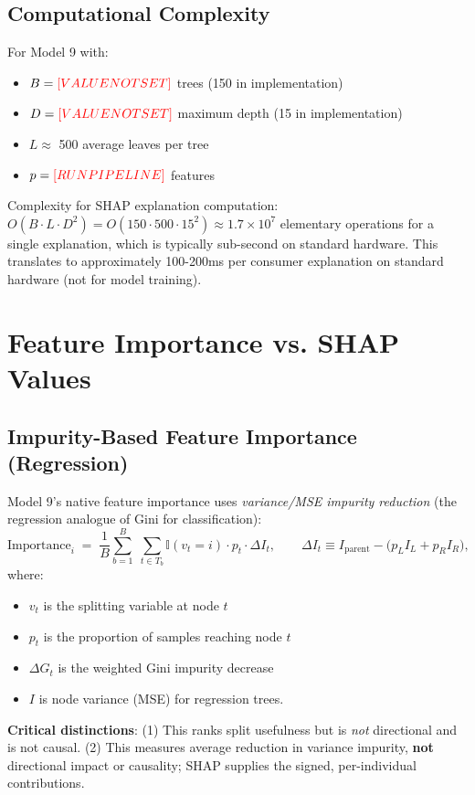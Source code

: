 \subsection{Computational Complexity}
For Model 9 with:
\begin{itemize}
    \item $B = \textcolor{red}{[VALUE NOT SET]}{}$ trees (150 in implementation)
    \item $D = \textcolor{red}{[VALUE NOT SET]}{}$ maximum depth (15 in implementation)
    \item $L \approx$ 500 average leaves per tree
    \item $p = \textcolor{red}{[RUN PIPELINE]}{}$ features
\end{itemize}
%
Complexity for SHAP explanation computation: $O(B \cdot L \cdot D^2) = O(150 \cdot 500 \cdot 15^2) \approx 1.7 \times 10^7$ elementary operations for a single explanation, which is typically sub-second on standard hardware. This translates to approximately 100-200ms per consumer explanation on standard hardware (not for model training).

\section{Feature Importance vs. SHAP Values}
\subsection{Impurity-Based Feature Importance (Regression)}
Model 9's native feature importance uses \emph{variance/MSE impurity reduction} (the regression analogue of Gini for classification):
%
\begin{equation}
    \text{Importance}_i \;=\; \frac{1}{B} \sum_{b=1}^{B} \;\sum_{t \in T_b} \mathbb{I}(v_t = i) \cdot p_t \cdot \Delta I_t,
    \qquad \Delta I_t \equiv I_{\text{parent}} - \big(p_L I_L + p_R I_R\big),
    \label{eq:variance_importance}
\end{equation}
where:
\begin{itemize}
    \item $v_t$ is the splitting variable at node $t$
    \item $p_t$ is the proportion of samples reaching node $t$
    \item $\Delta G_t$ is the weighted Gini impurity decrease
    \item $I$ is node variance (MSE) for regression trees. 
\end{itemize}
%
\textbf{Critical distinctions}: (1) This ranks split usefulness but is \emph{not} directional and is not causal. (2) This measures average reduction in variance impurity, \textbf{not} directional impact or causality; SHAP supplies the signed, per-individual contributions.


